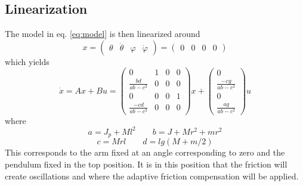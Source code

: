 \documentclass[10pt,a4paper]{article}
\begin{document}
\subsection{Linearization}
The model in eq. \ref{eq:model} is then linearized around
\begin{equation}
x =
\begin{pmatrix}
\theta & \dot\theta & \varphi & \dot\varphi
\end{pmatrix} = 
\begin{pmatrix}
0 & 0 & 0 & 0
\end{pmatrix}
\end{equation}
which yields 
\begin{equation}
\dot{x} = Ax + Bu =
\begin{pmatrix}
0 & 1 & 0  & 0 \\
\frac{bd}{ab-c^2} & 0 & 0 & 0 \\
0 & 0 & 0 & 1 \\
\frac{-cd}{ab-c^2} & 0 & 0 & 0
\end{pmatrix}x
+
\begin{pmatrix}
0 \\
\frac{-cg}{ab-c^2} \\
0 \\
\frac{ag}{ab-c^2}
\end{pmatrix}u
\label{eq:linear}
\end{equation}
where 
$$ a = J_p + M l^2 \qquad b = J + M r^2 + m r^2 $$
$$ c = M r l  \qquad d = l g (M + m/2) $$
This corresponds to the arm fixed at an angle corresponding to zero and the pendulum fixed in the top position. It is in this position that the friction will create oscillations and where the adaptive friction compensation will be applied.
\end{document}
